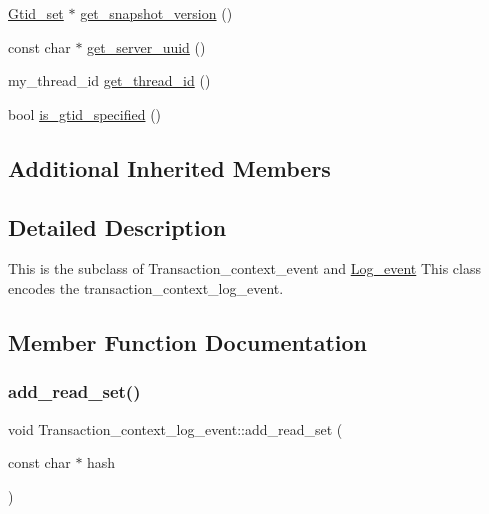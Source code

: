\begin{DoxyCompactItemize}
\item 
\mbox{\hyperlink{classGtid__set}{Gtid\+\_\+set}} $\ast$ \mbox{\hyperlink{classTransaction__context__log__event_a0fa37d983b04a7ae00f9b0435b072622}{get\+\_\+snapshot\+\_\+version}} ()
\item 
const char $\ast$ \mbox{\hyperlink{classTransaction__context__log__event_a9db2b1c01d38580c8c41958b5fea1f8d}{get\+\_\+server\+\_\+uuid}} ()
\item 
my\+\_\+thread\+\_\+id \mbox{\hyperlink{classTransaction__context__log__event_ad0c9e0bf6493bc3d70b64a575c74a640}{get\+\_\+thread\+\_\+id}} ()
\item 
bool \mbox{\hyperlink{classTransaction__context__log__event_a01c8f6ee2811131330772326b9e1f7df}{is\+\_\+gtid\+\_\+specified}} ()
\end{DoxyCompactItemize}
\subsection*{Additional Inherited Members}


\subsection{Detailed Description}
This is the subclass of Transaction\+\_\+context\+\_\+event and \mbox{\hyperlink{classLog__event}{Log\+\_\+event}} This class encodes the transaction\+\_\+context\+\_\+log\+\_\+event. 

\subsection{Member Function Documentation}
\mbox{\label{classTransaction__context__log__event_a436a05a16845aff723f8422ecacc39d2}} 
\subsubsection{\texorpdfstring{add\+\_\+read\+\_\+set()}{add\_read\_set()}}
{\footnotesize\ttfamily void Transaction\+\_\+context\+\_\+log\+\_\+event\+::add\+\_\+read\+\_\+set (\begin{DoxyParamCaption}\item[{const char $\ast$}]{hash }\end{DoxyParamCaption})}

